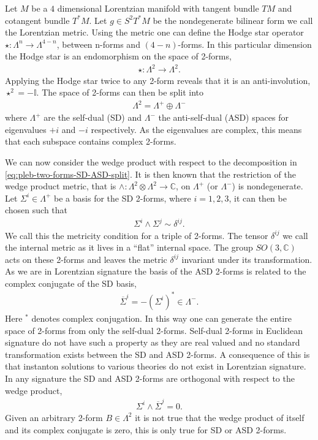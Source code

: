 \documentclass[10pt]{report}
\theoremstyle{definition}
\newcommand{\C}[0]{\mathbb{C}}
\newcommand{\id}{\mathbb{I}}
\newcommand{\asd}[0]{\overline{\Sigma}}
\begin{document}
Let $M$ be a $4$ dimensional Lorentzian manifold with tangent bundle $TM$ and cotangent bundle $T^*M$. Let $g \in S^2 T^*M$ be the nondegenerate bilinear form we call the Lorentzian metric. Using the metric one can define the Hodge star operator $\star : \Lambda^n \rightarrow \Lambda^{4-n}$, between n-forms and $(4-n)$-forms. In this particular dimension the Hodge star is an endomorphism on the space of 2-forms,
\begin{align}
    \star : \Lambda^2 \rightarrow \Lambda^2.
\end{align}
Applying the Hodge star twice to any 2-form reveals that it is an anti-involution, $\star^2 = -\id$. The space of 2-forms can then be split into 
\begin{align}
    \Lambda^2 = \Lambda^+ \oplus \Lambda^- \label{eq:pleb-two-forms-SD-ASD-split}
\end{align}
where $\Lambda^+ $ are the self-dual (SD) and $\Lambda^-$ the anti-self-dual (ASD) spaces for eigenvalues $+i$ and $-i$ respectively. As the eigenvalues are complex, this means that each subspace contains complex 2-forms.

We can now consider the wedge product with respect to the decomposition in \cref{eq:pleb-two-forms-SD-ASD-split}. It is then known that the restriction of the wedge product metric, that is $\wedge : \Lambda^2 \otimes \Lambda^2 \rightarrow \C$, on $\Lambda^+$ (or $\Lambda^-$) is nondegenerate. Let $\Sigma^i \in \Lambda^+$ be a basis for the SD 2-forms, where $i = 1,2,3$, it can then be chosen such that
\begin{align}
    \Sigma^i \wedge \Sigma^j \sim \delta^{ij}. \label{eq:pleb-metricity-condition}
\end{align}
We call this the metricity condition for a triple of 2-forms. The tensor $\delta^{ij}$ we call the internal metric as it lives in a ``flat'' internal space. The group $SO(3,\C)$ acts on these 2-forms and leaves the metric $\delta^{ij}$ invariant under its transformation. As we are in Lorentzian signature the basis of the ASD 2-forms is related to the complex conjugate of the SD basis,
\begin{align}
    \asd^i = -{(\Sigma^i)}^* \in \Lambda^-.
\end{align}
Here ${}^*$ denotes complex conjugation. In this way one can generate the entire space of 2-forms from only the self-dual 2-forms. Self-dual 2-forms in Euclidean signature do not have such a property as they are real valued and no standard transformation exists between the SD and ASD 2-forms. A consequence of this is that instanton solutions to various theories do not exist in Lorentzian signature. In any signature the SD and ASD 2-forms are orthogonal with respect to the wedge product,
\begin{align}
    \Sigma^i \wedge \asd^j = 0. \label{eq:pleb-reality-condition}
\end{align}
Given an arbitrary 2-form $B \in \Lambda^2$ it is not true that the wedge product of itself and its complex conjugate is zero, this is only true for SD or ASD 2-forms.
\end{document}
